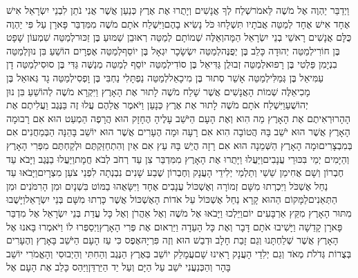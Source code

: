 \documentclass[../main/main.tex]{subfiles}
\begin{document}
\begin{multicols}{\ncols}
וַיְדַבֵּר יַהְוֶה אֶל מֹשֶׁה לֵּאמֹר\PreVerseSpace{}שְׁלַח לְךָ אֲנָשִׁים וְיָתֻרוּ אֶת אֶרֶץ כְּנַעַן אֲשֶׁר אֲנִי נֹתֵן לִבְנֵי יִשְׂרָאֵל אִישׁ אֶחָד אִישׁ אֶחָד לְמַטֵּה אֲבֹתָיו תִּשְׁלָחוּ כֹּל נָשִׂיא בָהֶם\PreVerseSpace{}וַיִּשְׁלַח אֹתָם מֹשֶׁה מִמִּדְבַּר פָּארָן עַל פִּי יַהְוֶה כֻּלָּם אֲנָשִׁים רָאשֵׁי בְנֵי יִשְׂרָאֵל הֵמָּה\PreVerseSpace{}וְאֵלֶּה שְׁמוֹתָם לְמַטֵּה רְאוּבֵן שַׁמּוּעַ בֶּן זַכּוּר\PreVerseSpace{}לְמַטֵּה שִׁמְעוֹן שָׁפָט בֶּן חוֹרִי\PreVerseSpace{}לְמַטֵּה יְהוּדָה כָּלֵב בֶּן יְפֻנֶּה\PreVerseSpace{}לְמַטֵּה יִשְׂשָׂכָר יִגְאָל בֶּן יוֹסֵף\PreVerseSpace{}לְמַטֵּה אֶפְרָיִם הוֹשֵׁעַ בִּן נוּן\PreVerseSpace{}לְמַטֵּה בִנְיָמִן פַּלְטִי בֶּן רָפוּא\PreVerseSpace{}לְמַטֵּה זְבוּלֻן גַּדִּיאֵל בֶּן סוֹדִי\PreVerseSpace{}לְמַטֵּה יוֹסֵף לְמַטֵּה מְנַשֶּׁה גַּדִּי בֶּן סוּסִי\PreVerseSpace{}לְמַטֵּה דָן עַמִּיאֵל בֶּן גְּמַלִּי\PreVerseSpace{}לְמַטֵּה אָשֵׁר סְתוּר בֶּן מִיכָאֵל\PreVerseSpace{}לְמַטֵּה נַפְתָּלִי נַחְבִּי בֶּן וָפְסִי\PreVerseSpace{}לְמַטֵּה גָד גְּאוּאֵל בֶּן מָכִי\PreVerseSpace{}אֵלֶּה שְׁמוֹת הָאֲנָשִׁים אֲשֶׁר שָׁלַח מֹשֶׁה לָתוּר אֶת הָאָרֶץ וַיִּקְרָא מֹשֶׁה לְהוֹשֵׁעַ בִּן נוּן יְהוֹשֻׁעַ\PreVerseSpace{}וַיִּשְׁלַח אֹתָם מֹשֶׁה לָתוּר אֶת אֶרֶץ כְּנָעַן וַיֹּאמֶר אֲלֵהֶם עֲלוּ זֶה בַּנֶּגֶב וַעֲלִיתֶם אֶת הָהָר\PreVerseSpace{}וּרְאִיתֶם אֶת הָאָרֶץ מַה הִוא וְאֶת הָעָם הַיֹּשֵׁב עָלֶיהָ הֶחָזָק הוּא הֲרָפֶה הַמְעַט הוּא אִם רָב\PreVerseSpace{}וּמָה הָאָרֶץ אֲשֶׁר הוּא יֹשֵׁב בָּהּ הֲטוֹבָה הִוא אִם רָעָה וּמָה הֶעָרִים אֲשֶׁר הוּא יוֹשֵׁב בָּהֵנָּה הַבְּמַחֲנִים אִם בְּמִבְצָרִים\PreVerseSpace{}וּמָה הָאָרֶץ הַשְּׁמֵנָה הוּא אִם רָזָה הֲיֵשׁ בָּהּ עֵץ אִם אַיִן וְהִתְחַזַּקְתֶּם וּלְקַחְתֶּם מִפְּרִי הָאָרֶץ וְהַיָּמִים יְמֵי בִּכּוּרֵי עֲנָבִים\PreVerseSpace{}וַיַּעֲלוּ וַיָּתֻרוּ אֶת הָאָרֶץ מִמִּדְבַּר צִן עַד רְחֹב לְבֹא חֲמָת\PreVerseSpace{}וַיַּעֲלוּ בַנֶּגֶב וַיָּבֹא עַד חֶבְרוֹן וְשָׁם אֲחִימַן שֵׁשַׁי וְתַלְמַי יְלִידֵי הָעֲנָק וְחֶבְרוֹן שֶׁבַע שָׁנִים נִבְנְתָה לִפְנֵי צֹעַן מִצְרָיִם\PreVerseSpace{}וַיָּבֹאוּ עַד נַחַל אֶשְׁכֹּל וַיִּכְרְתוּ מִשָּׁם זְמוֹרָה וְאֶשְׁכּוֹל עֲנָבִים אֶחָד וַיִּשָּׂאֻהוּ בַמּוֹט בִּשְׁנָיִם וּמִן הָרִמֹּנִים וּמִן הַתְּאֵנִים\PreVerseSpace{}לַמָּקוֹם הַהוּא קָרָא נַחַל אֶשְׁכּוֹל עַל אֹדוֹת הָאֶשְׁכּוֹל אֲשֶׁר כָּרְתוּ מִשָּׁם בְּנֵי יִשְׂרָאֵל\PreVerseSpace{}וַיָּשֻׁבוּ מִתּוּר הָאָרֶץ מִקֵּץ אַרְבָּעִים יוֹם\PreVerseSpace{}וַיֵּלְכוּ וַיָּבֹאוּ אֶל מֹשֶׁה וְאֶל אַהֲרֹן וְאֶל כָּל עֲדַת בְּנֵי יִשְׂרָאֵל אֶל מִדְבַּר פָּארָן קָדֵשָׁה וַיָּשִׁיבוּ אֹתָם דָּבָר וְאֶת כָּל הָעֵדָה וַיַּרְאוּם אֶת פְּרִי הָאָרֶץ\PreVerseSpace{}וַיְסַפְּרוּ לוֹ וַיֹּאמְרוּ בָּאנוּ אֶל הָאָרֶץ אֲשֶׁר שְׁלַחְתָּנוּ וְגַם זָבַת חָלָב וּדְבַשׁ הוּא וְזֶה פִּרְיָהּ\PreVerseSpace{}אֶפֶס כִּי עַז הָעָם הַיֹּשֵׁב בָּאָרֶץ וְהֶעָרִים בְּצֻרוֹת גְּדֹלֹת מְאֹד וְגַם יְלִדֵי הָעֲנָק רָאִינוּ שָׁם\PreVerseSpace{}עֲמָלֵק יוֹשֵׁב בְּאֶרֶץ הַנֶּגֶב וְהַחִתִּי וְהַיְבוּסִי וְהָאֱמֹרִי יוֹשֵׁב בָּהָר וְהַכְּנַעֲנִי יֹשֵׁב עַל הַיָּם וְעַל יַד הַיַּרְדֵּן\PreVerseSpace{}וַיַּהַס כָּלֵב אֶת הָעָם אֶל 
\end{multicols}
\end{document}
